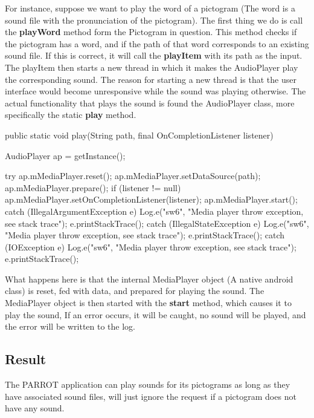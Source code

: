 For instance, suppose we want to play the word of a pictogram (The word is a sound file with the pronunciation of the pictogram). 
The first thing we do is call the \textbf{playWord} method form the Pictogram in question. 
This method checks if the pictogram has a word, and if the path of that word corresponds to an existing sound file. 
If this is correct, it will call the \textbf{playItem} with its path as the input. 
The playItem then starts a new thread in which it makes the AudioPlayer play the corresponding sound. 
The reason for starting a new thread is that the user interface would become unresponsive while the sound was playing otherwise.\newline
The actual functionality that plays the sound is found the AudioPlayer class, more specifically the static \textbf{play} method.\newline

\begin{source}{}
	public static void play(String path, final OnCompletionListener listener)
	{
		AudioPlayer ap = getInstance();
		 
		try {
			ap.mMediaPlayer.reset();
			ap.mMediaPlayer.setDataSource(path);
			ap.mMediaPlayer.prepare();
			if (listener != null)
				ap.mMediaPlayer.setOnCompletionListener(listener);
			ap.mMediaPlayer.start(); 
		} catch (IllegalArgumentException e) {
			Log.e("sw6", "Media player throw exception, see stack trace");
			e.printStackTrace();
		} catch (IllegalStateException e) {
			Log.e("sw6", "Media player throw exception, see stack trace");
			e.printStackTrace();
		} catch (IOException e) {
			Log.e("sw6", "Media player throw exception, see stack trace");
			e.printStackTrace();
		} 
	}
\end{source}

What happens here is that the internal MediaPlayer object (A native android class) is reset, fed with data, and prepared for playing the sound. The MediaPlayer object is then started with the \textbf{start} method, which causes it to play the sound, If an error occurs, it will be caught, no sound will be played, and the error will be written to the log.\newline

\subsection*{Result}
The PARROT application can play sounds for its pictograms as long as they have associated sound files, will just ignore the request if a pictogram does not have any sound.


